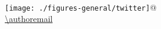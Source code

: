 {\begin{frame}
 
\begin{columns}[t]
\column{0.8\hsize}
\begin{columns}[t]
\column{0.6\hsize}
\insertauthor \\[2mm]
\authoraffiliation\\[2mm]
\column{0.25\hsize}
\\[2mm]
\texttt{[image: ./figures-general/twitter]}{\small @\authortwitter}\\[-1mm]
\mbox{\small \url{\authoremail}}
\end{columns}
\column{0.14\hsize}
\end{columns}
\vspace{7mm}
\insertdate
\end{frame}
}

